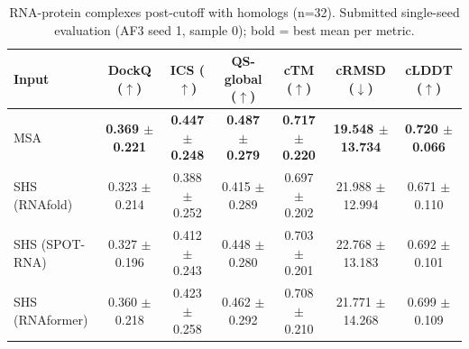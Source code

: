 \begin{table}[htbp]
\centering
\caption{RNA-protein complexes post-cutoff with homologs (n=32). Submitted single-seed evaluation (AF3 seed 1, sample 0); bold = best mean per metric.}
\label{tab:rna_protein_complexes_post_cutoff_with_homologs}
\begin{tabular}{lcccccc}
\toprule
Input & DockQ ($\uparrow$) & ICS ($\uparrow$) & QS-global ($\uparrow$) & cTM ($\uparrow$) & cRMSD ($\downarrow$) & cLDDT ($\uparrow$) \\
\midrule
MSA & \textbf{0.369 $\pm$ 0.221} & \textbf{0.447 $\pm$ 0.248} & \textbf{0.487 $\pm$ 0.279} & \textbf{0.717 $\pm$ 0.220} & \textbf{19.548 $\pm$ 13.734} & \textbf{0.720 $\pm$ 0.066} \\
SHS (RNAfold) & 0.323 $\pm$ 0.214 & 0.388 $\pm$ 0.252 & 0.415 $\pm$ 0.289 & 0.697 $\pm$ 0.202 & 21.988 $\pm$ 12.994 & 0.671 $\pm$ 0.110 \\
SHS (SPOT-RNA) & 0.327 $\pm$ 0.196 & 0.412 $\pm$ 0.243 & 0.448 $\pm$ 0.280 & 0.703 $\pm$ 0.201 & 22.768 $\pm$ 13.183 & 0.692 $\pm$ 0.101 \\
SHS (RNAformer) & 0.360 $\pm$ 0.218 & 0.423 $\pm$ 0.258 & 0.462 $\pm$ 0.292 & 0.708 $\pm$ 0.210 & 21.771 $\pm$ 14.268 & 0.699 $\pm$ 0.109 \\
\bottomrule
\end{tabular}
\end{table}
